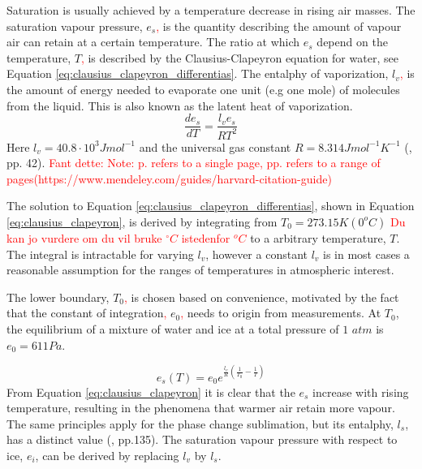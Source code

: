 Saturation is usually achieved by a temperature decrease in rising air masses. The saturation vapour pressure, $e_s$\textcolor{red}{,} is the quantity describing the amount of vapour air can retain at a certain temperature. The ratio at which $e_s$ depend on the temperature, $T$\textcolor{red}{,} is described by the Clausius-Clapeyron equation for water, see Equation \eqref{eq:clausius_clapeyron_differentias}. The entalphy of vaporization, $l_v$\textcolor{red}{,} is the amount of energy needed to evaporate one unit (e.g one mole) of molecules from the liquid. This is also known as the latent heat of vaporization. 
\begin{equation} \label{eq:clausius_clapeyron_differentias}
    \frac{de_s}{dT} = \frac{l_v e_s}{R T^2}
\end{equation}
Here $l_v = 40.8 \cdot 10^3 J mol^{-1}$ and the universal gas constant $R= 8.314 J mol^{-1} K^{-1}$ (\cite{cloud_phys_book_johanne}, pp. 42). \textcolor{red}{Fant dette: Note: p. refers to a single page, pp. refers to a range of pages(https://www.mendeley.com/guides/harvard-citation-guide)}

The solution to Equation \eqref{eq:clausius_clapeyron_differentias}, shown in Equation \eqref{eq:clausius_clapeyron}, is derived by integrating from $T_0 = 273.15K \left(0 ^oC \right)$ \textcolor{red}{Du kan jo vurdere om du vil bruke $^{\circ}C$ istedenfor $ ^oC$}  to a arbitrary temperature, $T$. The integral is intractable for varying $l_v$, however a constant $l_v$ is in most cases a reasonable assumption for the ranges of temperatures in atmospheric interest.

The lower boundary, $T_0$\textcolor{red}{,} is chosen based on convenience, motivated by the fact that the constant of integration\textcolor{red}{,} $e_0$\textcolor{red}{,} needs to origin from measurements. At $T_0$, the equilibrium of a mixture of water and ice at a total pressure of $1$ $atm$ is $e_0 = 611Pa$. 

\begin{equation} \label{eq:clausius_clapeyron}
    e_s\left( T \right) = e_0 e^{\frac{l_v}{R} \left( \frac{1}{T_0} - \frac{1}{T} \right) }
\end{equation}
From Equation \eqref{eq:clausius_clapeyron} it is clear that the $e_s$ increase with rising temperature, resulting in the phenomena that warmer air retain more vapour. The same principles apply for the phase change sublimation, but its entalphy, $l_s$, has a distinct value (\cite{cloud_phys_book_johanne}, pp.135). The saturation vapour pressure with respect to ice, $e_i$, can be derived by replacing $l_v$ by $l_s$.

